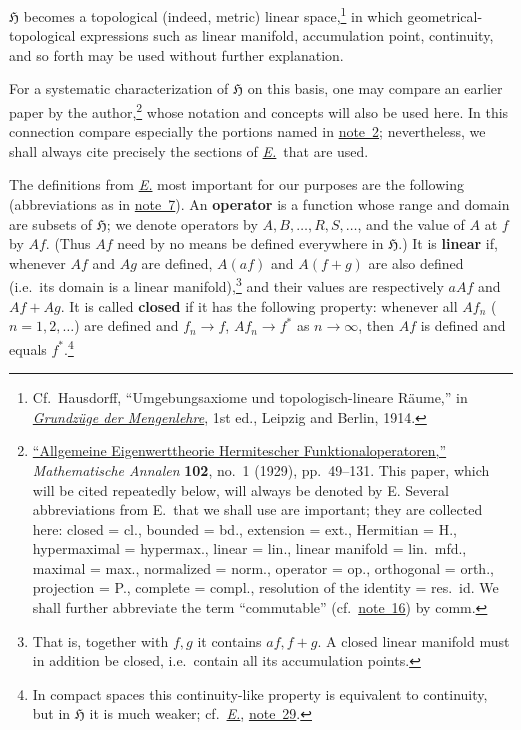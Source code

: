 \documentclass[
  paper=b5,
  twoside=true,
  fontsize=13pt,
  headings=normal,
  bookmarkpackage=false
]{scrartcl}
\theoremstyle{definition}
\newcommand{\NoteRef}[1]{\hyperref[fn:#1]{note~#1}}
\newcommand{\Eref}{\hyperref[fn:E-paper]{\emph{E.}}}
\newcommand{\ErefText}[1]{\href{https://doi.org/10.1007/BF01782338}{#1}}
\begin{document}
$\mathfrak H$ becomes a topological (indeed, metric) linear
space,\footnote{\label{fn:6}Cf.\ Hausdorff, ``Umgebungsaxiome und
topologisch-lineare R\"aume,'' in \href{https://archive.org/details/grundzgedermen00hausuoft}{\emph{Grundz\"uge der Mengenlehre}},
1st ed., Leipzig and Berlin, 1914.} in which geometrical-topological
expressions such as linear manifold, accumulation point, continuity, and so
forth may be used without further explanation.

For a systematic characterization of $\mathfrak H$ on this basis, one may
compare an earlier paper by the author,\footnote{\label{fn:7}\label{fn:E-paper}
\ErefText{``Allgemeine Eigenwerttheorie Hermitescher Funktionaloperatoren,''}
\emph{Mathematische Annalen} \textbf{102}, no.~1 (1929), pp.~49--131.
This paper, which will be cited repeatedly below, will always be denoted by
E. Several abbreviations from E.\ that we shall use are important; they are
collected here: closed = cl., bounded = bd., extension = ext., Hermitian =
H., hypermaximal = hypermax., linear = lin., linear manifold = lin.~mfd.,
maximal = max., normalized = norm., operator = op., orthogonal = orth.,
projection = P., complete = compl., resolution of the identity = res.~id.
We shall further abbreviate the term ``commutable'' (cf.\ \NoteRef{16}) by
comm.} whose notation and concepts will also be used here. In this
connection compare especially the portions named in \NoteRef{2}; nevertheless,
we shall always cite precisely the sections of \Eref{}\ that are used.

The definitions from \Eref{} most important for our purposes are the following
(abbreviations as in \NoteRef{7}). An \textbf{operator} is a function whose range and
domain are subsets of $\mathfrak H$; we denote operators by
$A,B,\ldots,R,S,\ldots$, and the value of $A$ at $f$ by $Af$. (Thus $Af$
need by no means be defined everywhere in $\mathfrak H$.) It is \textbf{linear} if,
whenever $Af$ and $Ag$ are defined, $A(af)$ and $A(f+g)$ are also defined
(i.e.\ its domain
is a linear manifold),\footnote{\label{fn:8}That is, together with $f,g$ it contains
$af,f+g$. A closed linear manifold must in addition be closed, i.e.\ contain
all its accumulation points.} and their values are respectively $aAf$ and
$Af+Ag$. It is called \textbf{closed} if it has the following property: whenever all
$Af_n$ ($n=1,2,\ldots$) are defined and $f_n\to f$, $Af_n\to f^*$ as $n\to\infty$,
then $Af$ is defined and equals $f^*$.\footnote{\label{fn:9}In compact spaces this
continuity-like property is equivalent to continuity, but in $\mathfrak H$
it is much weaker; cf.\ \Eref, \ErefText{note~29}.}
\end{document}
